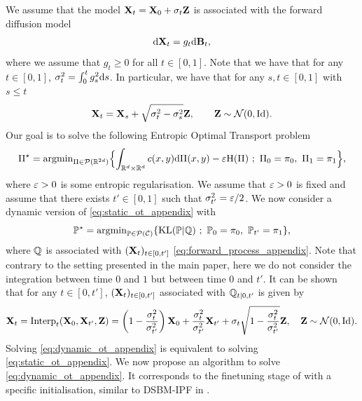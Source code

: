\documentclass{article}
\begin{document}
We assume that the model $\mathbf{X}_t = \mathbf{X}_0 + \sigma_t \mathbf{Z}$ is associated with the forward diffusion model 
\begin{equation}
\label{eq:forward_process_appendix}
    \rmd \bfX_t =  g_t \rmd \bfB_t,
\end{equation}
where we assume that $g_t \geq 0$ for all $t \in [0,1]$. Note that we have that for any $t \in [0,1]$, $\sigma_t^2 = \int_0^t g_s^2 \mathrm{d} s$. In particular, we have that for any $s, t \in [0,1]$ with $s \leq t$
\begin{equation}
    \mathbf{X}_t = \mathbf{X}_s + \sqrt{\sigma_t^2 - \sigma_s^2} \mathbf{Z} , \qquad \mathbf{Z} \sim \mathcal{N}(0, \mathrm{Id}) . 
\end{equation}
Our goal is to solve the following Entropic Optimal Transport problem 
\begin{equation}
\label{eq:static_ot_appendix}
  \Pi^\star = \argmin_{\Pi \in \calP(\rset^{2d})} \Bigl\{ \int_{\rset^d \times \rset^d} c(x,y) \rmd \Pi(x,y) - \varepsilon \mathrm{H}(\Pi) \ ; \ \Pi_0 = \pi_0, \ \Pi_1 = \pi_1 \Bigr\} ,
\end{equation}
where $\varepsilon > 0$ is some entropic regularisation. We assume that $\varepsilon >0$ is fixed and assume that there exists $t' \in [0,1]$ such that $\sigma_{t'}^2 = \varepsilon/2$. We now consider a dynamic version of \eqref{eq:static_ot_appendix} with
\begin{equation}
    \label{eq:dynamic_ot_appendix}
    \Pbb^\star = \argmin_{\Pbb \in \calP(\calC)} \{ \KL(\Pbb | \Qbb)  \ ; \ \Pbb_0 = \pi_0, \ \Pbb_{t'} = \pi_1 \} ,
\end{equation}
where $\mathbb{Q}$ is associated with $(\mathbf{X}_t)_{t \in [0, t']}$ \eqref{eq:forward_process_appendix}. Note that contrary to the setting presented in the main paper, here we do not consider the integration between time $0$ and $1$ but between time $0$ and $t'$. It can be shown that for any $t \in [0, t']$, $(\mathbf{X}_t)_{t \in [0,t']}$ associated with $\mathbb{Q}_{t|0, t'}$ is given by 
\begin{equation}
\label{eq:interpolation_brownian_motion_appendix}
\bfX_t = \mathrm{Interp}_t(\bfX_0, \bfX_{t'}, \bfZ) = \left(1-\frac{\sigma_t^2}{\sigma_{t'}^2}\right) \bfX_0 + \frac{\sigma_t^2}{\sigma_{t'}^2} \bfX_{t'} + \sigma_t \sqrt{1 - \frac{\sigma_t^2}{\sigma_{t'}^2} } \bfZ , \quad \bfZ \sim \gN(0, \Id) .
\end{equation}
Solving \eqref{eq:dynamic_ot_appendix} is equivalent to solving \eqref{eq:static_ot_appendix}. We now propose an algorithm to solve \eqref{eq:dynamic_ot_appendix}. It corresponds to the finetuning stage of  with a specific initialisation, similar to DSBM-IPF in \cite{shi2023DSBM}. 
\end{document}
